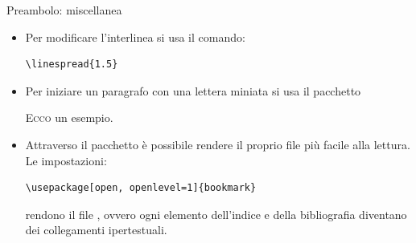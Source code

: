 \documentclass{beamer}
\begin{document}
\begin{frame}[fragile]{Preambolo: miscellanea}
\begin{itemize}
\item Per modificare l'interlinea si usa il comando:
\begin{verbatim}
\linespread{1.5}
\end{verbatim}
\item Per iniziare un paragrafo con una lettera miniata si usa il pacchetto 
\begin{exampletwouptiny}
\lettrine{E}{cco} un esempio.
\end{exampletwouptiny}
\item Attraverso il pacchetto  \`e possibile rendere il proprio file pi\`u facile alla lettura. Le impostazioni:

\begin{verbatim}
\usepackage[open, openlevel=1]{bookmark}
\end{verbatim}
rendono il file , ovvero ogni elemento dell'indice e della bibliografia diventano dei collegamenti ipertestuali.
\end{itemize}

\end{frame}
\end{document}
